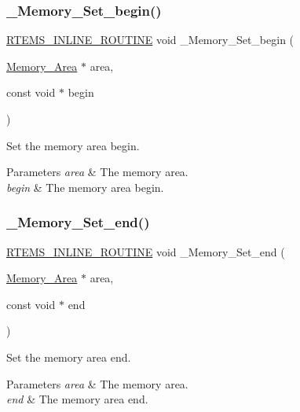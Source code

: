 \subsubsection{\texorpdfstring{\_Memory\_Set\_begin()}{\_Memory\_Set\_begin()}}
{\footnotesize\ttfamily \mbox{\hyperlink{group__RTEMSScoreBaseDefs_gac216239df231d5dbd15e3520b0b9313f}{R\+T\+E\+M\+S\+\_\+\+I\+N\+L\+I\+N\+E\+\_\+\+R\+O\+U\+T\+I\+NE}} void \+\_\+\+Memory\+\_\+\+Set\+\_\+begin (\begin{DoxyParamCaption}\item[{\mbox{\hyperlink{structMemory__Area}{Memory\+\_\+\+Area}} $\ast$}]{area,  }\item[{const void $\ast$}]{begin }\end{DoxyParamCaption})}



Set the memory area begin. 


\begin{DoxyParams}{Parameters}
{\em area} & The memory area. \\
\hline
{\em begin} & The memory area begin. \\
\hline
\end{DoxyParams}
\mbox{\label{group__RTEMSScoreMemory_gacd18befdd1d46d2a0fec4503728247ce}} 
\subsubsection{\texorpdfstring{\_Memory\_Set\_end()}{\_Memory\_Set\_end()}}
{\footnotesize\ttfamily \mbox{\hyperlink{group__RTEMSScoreBaseDefs_gac216239df231d5dbd15e3520b0b9313f}{R\+T\+E\+M\+S\+\_\+\+I\+N\+L\+I\+N\+E\+\_\+\+R\+O\+U\+T\+I\+NE}} void \+\_\+\+Memory\+\_\+\+Set\+\_\+end (\begin{DoxyParamCaption}\item[{\mbox{\hyperlink{structMemory__Area}{Memory\+\_\+\+Area}} $\ast$}]{area,  }\item[{const void $\ast$}]{end }\end{DoxyParamCaption})}



Set the memory area end. 


\begin{DoxyParams}{Parameters}
{\em area} & The memory area. \\
\hline
{\em end} & The memory area end. \\
\hline
\end{DoxyParams}
\mbox{\label{group__RTEMSScoreMemory_gad4aab7f862ed22005baa5d6524f2471d}} 
